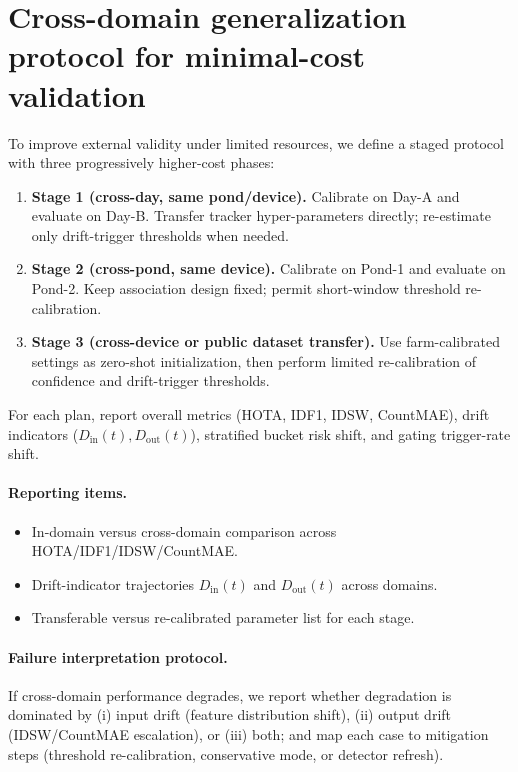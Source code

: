 \documentclass[5p,twocolumn,a4paper]{elsarticle}
\begin{document}
\section{Cross-domain generalization protocol for minimal-cost validation}
To improve external validity under limited resources, we define a staged protocol with three progressively higher-cost phases:
\begin{enumerate}
  \item \textbf{Stage 1 (cross-day, same pond/device).}
  Calibrate on Day-A and evaluate on Day-B. Transfer tracker hyper-parameters directly; re-estimate only drift-trigger thresholds when needed.
  \item \textbf{Stage 2 (cross-pond, same device).}
  Calibrate on Pond-1 and evaluate on Pond-2. Keep association design fixed; permit short-window threshold re-calibration.
  \item \textbf{Stage 3 (cross-device or public dataset transfer).}
  Use farm-calibrated settings as zero-shot initialization, then perform limited re-calibration of confidence and drift-trigger thresholds.
\end{enumerate}

For each plan, report overall metrics (HOTA, IDF1, IDSW, CountMAE), drift indicators ($D_{\mathrm{in}}(t), D_{\mathrm{out}}(t)$), stratified bucket risk shift, and gating trigger-rate shift.

\paragraph{Reporting items.}
\begin{itemize}
  \item In-domain versus cross-domain comparison across HOTA/IDF1/IDSW/CountMAE.
  \item Drift-indicator trajectories $D_{\mathrm{in}}(t)$ and $D_{\mathrm{out}}(t)$ across domains.
  \item Transferable versus re-calibrated parameter list for each stage.
\end{itemize}

\paragraph{Failure interpretation protocol.}
If cross-domain performance degrades, we report whether degradation is dominated by (i) input drift (feature distribution shift), (ii) output drift (IDSW/CountMAE escalation), or (iii) both; and map each case to mitigation steps (threshold re-calibration, conservative mode, or detector refresh).
\end{document}
